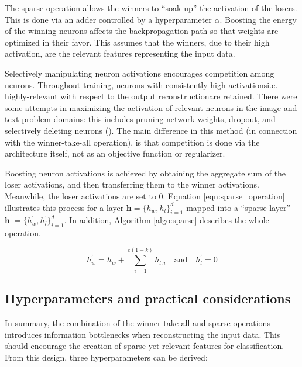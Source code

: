 \par The sparse operation allows the winners to ``soak-up'' the activation of
the losers. This is done via an adder controlled by a hyperparameter
$\alpha$. Boosting the energy of the winning neurons affects the
backpropagation path so that weights are optimized in their favor. This
assumes that the winners, due to their high activation, are the relevant
features representing the input data.

\par Selectively manipulating neuron activations encourages competition among
neurons. Throughout training, neurons with consistently high
activations\textemdash i.e. highly-relevant with respect to the output
reconstruction\textemdash are retained. There were some attempts in
maximizing the activation of relevant neurons in the image and text problem
domains: this includes pruning network weights, dropout, and selectively
deleting neurons (\cite{louizos2017learning, chen2017kate, theis2018faster}).
The main difference in this method (in connection with the winner-take-all
operation), is that competition is done via the architecture itself, not as
an objective function or regularizer.

\par Boosting neuron activations is achieved by obtaining the aggregate sum
of the loser activations, and then transferring them to the winner
activations. Meanwhile, the loser activations are set to $0$. Equation
\ref{eqn:sparse_operation} illustrates this process for a layer $\mathbf{h} =
\{h_{w}, h_{l}\}_{i=1}^{d}$ mapped into a ``sparse layer''
$\mathbf{h}^{\prime} = \{h^{\prime}_w, h^{\prime}_l\}_{i=1}^{d}$. In
addition, Algorithm \ref{algo:sparse} describes the whole operation.

\begin{equation}
  \label{eqn:sparse_operation}
  h^{\prime}_{w} = h_{w} + \sum_{i=1}^{e(1-k)}h_{l,i} \quad \text{and} \quad h^{\prime}_l = 0 
\end{equation}



\subsection{Hyperparameters and practical considerations}

\par In summary, the combination of the winner-take-all and sparse operations
introduces information bottlenecks when reconstructing the input data. This
should encourage the creation of sparse yet relevant features for
classification. From this design, three hyperparameters can be derived:


